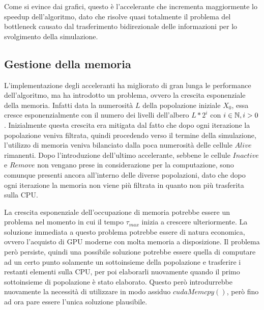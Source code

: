 Come si evince dai grafici, questo è l'accelerante che incrementa maggiormente
lo speedup dell'algoritmo, dato che risolve quasi totalmente il problema
del bottleneck causato dal trasferimento bidirezionale delle informazioni
per lo svolgimento della simulazione.

\subsection{Gestione della memoria}

L'implementazione degli acceleranti ha migliorato di gran lunga le
performance dell'algoritmo, ma ha introdotto un problema, ovvero la crescita
esponenziale della memoria.
Infatti data la numerosità $L$ della popolazione iniziale $X_{0}$, essa cresce
esponenzialmente con il numero dei livelli dell'albero $L * 2^i$ con
$i \in \mathbb{N}, i > 0$. Inizialmente questa crescita era mitigata dal fatto che
dopo ogni iterazione la popolazione veniva filtrata, quindi procedendo verso
il termine della simulazione, l'utilizzo di memoria veniva bilanciato dalla
poca numerosità delle cellule $Alive$ rimanenti.
Dopo l'introduzione dell'ultimo accelerante, sebbene le cellule $Inactive$ e
$Remove$ non vengano prese in considerazione per la computazione, sono
comunque presenti ancora all'interno delle diverse popolazioni, dato che
dopo ogni iterazione la memoria non viene più filtrata in quanto non più
trasferita sulla CPU.

\begin{figure}[H]
    \centering
    \caption{}
\end{figure}

La crescita esponenziale dell'occupazione di memoria potrebbe essere un
problema nel momento in cui il tempo $\tau_{max}$ inizia a crescere
ulteriormente. La soluzione immediata a questo problema potrebbe essere di
natura economica, ovvero l'acquisto di GPU moderne con molta memoria a
disposizione. Il problema però persiste, quindi una possibile soluzione
potrebbe essere quella di computare ad un certo punto solamente un sottoinsieme
della popolazione e trasferire i restanti elementi sulla CPU, per poi
elaborarli nuovamente quando il primo sottoinsieme di popolazione è stato
elaborato. Questo però introdurrebbe nuovamente la necessità di utilizzare
in modo assiduo $cudaMemcpy()$, però fino ad ora pare essere l'unica soluzione
plausibile.
